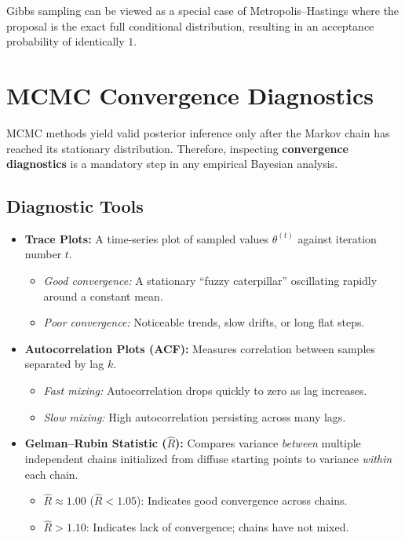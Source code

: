 \documentclass[12pt,a4paper]{article}
\begin{document}
\begin{keyidea}
Gibbs sampling can be viewed as a special case of Metropolis--Hastings where the proposal is the exact full conditional distribution, resulting in an acceptance probability of identically $1$.
\end{keyidea}

\newpage

\section{MCMC Convergence Diagnostics}

MCMC methods yield valid posterior inference only after the Markov chain has reached its stationary distribution. Therefore, inspecting \textbf{convergence diagnostics} is a mandatory step in any empirical Bayesian analysis.

\subsection{Diagnostic Tools}

\begin{itemize}[leftmargin=1.5em]
    \item \textbf{Trace Plots:} A time-series plot of sampled values $\theta^{(t)}$ against iteration number $t$.
    \begin{itemize}
        \item \textit{Good convergence:} A stationary ``fuzzy caterpillar'' oscillating rapidly around a constant mean.
        \item \textit{Poor convergence:} Noticeable trends, slow drifts, or long flat steps.
    \end{itemize}
    
    \item \textbf{Autocorrelation Plots (ACF):} Measures correlation between samples separated by lag $k$.
    \begin{itemize}
        \item \textit{Fast mixing:} Autocorrelation drops quickly to zero as lag increases.
        \item \textit{Slow mixing:} High autocorrelation persisting across many lags.
    \end{itemize}

    \item \textbf{Gelman--Rubin Statistic ($\hat{R}$):} Compares variance \emph{between} multiple independent chains initialized from diffuse starting points to variance \emph{within} each chain.
    \begin{itemize}
        \item $\hat{R} \approx 1.00$ ($\hat{R} < 1.05$): Indicates good convergence across chains.
        \item $\hat{R} > 1.10$: Indicates lack of convergence; chains have not mixed.
    \end{itemize}
\end{itemize}
\end{document}
